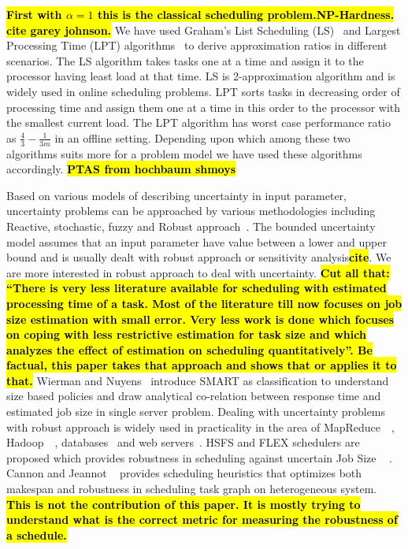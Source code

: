 \documentclass[10pt, conference, compsocconf]{IEEEtran}
\newcommand{\todo}[1]{{\color{red}\textbf{\hl{#1}}\xspace}}
\begin{document}
\todo{First with $\alpha=1$ this is the classical scheduling
  problem.}\todo{NP-Hardness. cite garey johnson.} We have used
Graham's List Scheduling (LS)~\cite{Graham66} and Largest Processing
Time (LPT) algorithms~\cite{Graham69boundson} to derive approximation
ratios in different scenarios. The LS algorithm takes tasks one at a
time and assign it to the processor having least load at that time. LS
is 2-approximation algorithm and is widely used in online scheduling
problems. LPT sorts tasks in decreasing order of processing time and
assign them one at a time in this order to the processor with the
smallest current load. The LPT algorithm has worst case performance
ratio as $\frac{4}{3}-\frac{1}{3m} $ in an offline setting. Depending
upon which among these two algorithms suits more for a problem model
we have used these algorithms accordingly. \todo{PTAS from hochbaum shmoys}



Based on various models of describing uncertainty in input parameter,
uncertainty problems can be approached by various methodologies
including Reactive, stochastic, fuzzy and Robust
approach~\cite{DBLP:journals/cce/LiI08}. The bounded uncertainty model
assumes that an input parameter have value between a lower and upper
bound and is usually dealt with robust approach or sensitivity
analysis\todo{cite}. We are more interested in robust approach to deal
with uncertainty. \todo{Cut all that: ``There is very less literature
  available for scheduling with estimated processing time of a
  task. Most of the literature till now focuses on job size estimation
  with small error. Very less work is done which focuses on coping
  with less restrictive estimation for task size and which analyzes
  the effect of estimation on scheduling quantitatively''. Be factual,
  this paper takes that approach and shows that or applies it to
  that.} Wierman and Nuyens~\cite{conf/sigmetrics/WiermanN08}
introduce SMART as classification to understand size based policies
and draw analytical co-relation between response time and estimated
job size in single server problem. Dealing with uncertainty problems
with robust approach is widely used in practicality in the area of
MapReduce~\cite{Kavulya:2010:ATP:1844765.1845224}~\cite{Verma:2011:AAR:1998582.1998637},
Hadoop~\cite{Wolf:2010:FSA:2023718.2023720}~\cite{White:2009:HDG:1717298},
databases~\cite{Lipton199518} and web
servers~\cite{Cardellini99dynamicload}. HSFS and FLEX schedulers are
proposed which provides robustness in scheduling against uncertain Job
Size ~\cite{Wolf:2010:FSA:2023718.2023720} \cite{6691554}. Cannon and
Jeannot ~\cite{cj09c} provides scheduling heuristics that optimizes
both makespan and robustness in scheduling task graph on heterogeneous
system. \todo{This is not the contribution of this paper. It is mostly
  trying to understand what is the correct metric for measuring the
  robustness of a schedule. }
\end{document}

